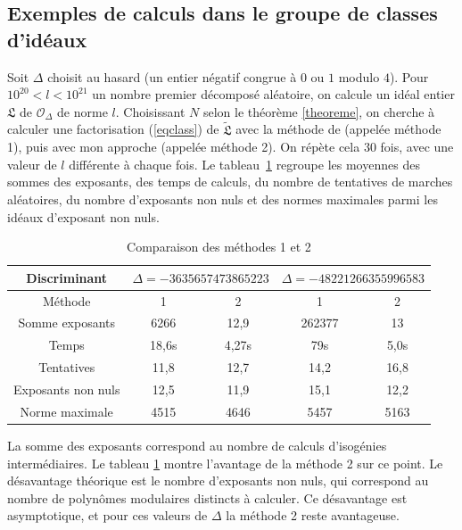 \documentclass{article}
\newcommand{\OR}[0]{\mathcal{O}}
\newcommand{\LR}[0]{\mathfrak{L}}
\newcommand{\CL}[0]{\tilde{\LR}}
\theoremstyle{definition}
\theoremstyle{remark}
\begin{document}
\subsection{Exemples de calculs dans le groupe de classes d'idéaux}
	
	Soit $\Delta$ choisit au hasard (un entier négatif congrue à $0$ ou $1$ modulo $4$). Pour $10^{20} < l < 10^{21}$ un nombre premier décomposé aléatoire, on calcule un idéal entier $\LR$ de $\OR_{\Delta}$ de norme $l$. Choisissant $N$ selon le théorème \ref{theoreme}, on cherche à calculer une factorisation (\ref{eqclass}) de $\CL$ avec la méthode de \cite{JaoSoukharev} (appelée méthode 1), puis avec mon approche (appelée méthode 2). On répète cela $30$ fois, avec une valeur de $l$ différente à chaque fois. Le tableau~\ref{tableauexp} regroupe les moyennes des sommes des exposants, des temps de calculs, du nombre de tentatives de marches aléatoires, du nombre d'exposants non nuls et des normes maximales parmi les idéaux d'exposant non nuls.
	
	\begin{table}[h]
		\begin{center}
			\begin{tabular}{|c|cc|cc|}
				\hline
				Discriminant & \multicolumn{2}{c|}{$\Delta = -3635657473865223$} & \multicolumn{2}{c|}{$\Delta = -48221266355996583$}  \\
				\hline
				Méthode & 1 & 2 & 1 & 2 \\
				\hline
				Somme exposants & 6266 & 12,9 & 262377 & 13 \\
				\hline
				Temps & 18,6s & 4,27s & 79s & 5,0s \\
				\hline
				Tentatives & 11,8 & 12,7 & 14,2 & 16,8 \\
				\hline
				Exposants non nuls & 12,5 & 11,9 & 15,1 & 12,2 \\
				\hline
				Norme maximale & 4515 & 4646 & 5457 & 5163 \\
				\hline
			\end{tabular}
		\end{center}
		\caption{Comparaison des méthodes 1 et 2}
		\label{tableauexp}
	\end{table}
	
	La somme des exposants correspond au nombre de calculs d'isogénies intermédiaires. Le tableau \ref{tableauexp} montre l'avantage de la méthode 2 sur ce point. Le désavantage théorique est le nombre d'exposants non nuls, qui correspond au nombre de polynômes modulaires distincts à calculer. Ce désavantage est asymptotique, et pour ces valeurs de $\Delta$ la méthode 2 reste avantageuse.
	
\end{document}
